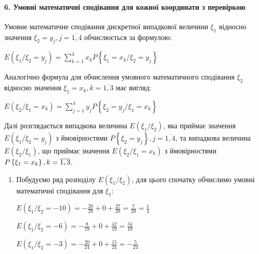 \documentclass[a4paper, 20pt, titlepage]{article}
\begin{document}
\vspace{-8mm}
\paragraph{6. Умовні математичні сподівання для кожної координати з перевіркою}
\hfill \break

\begin{spacing}{1.4}
Умовне математичне сподівання дискретної випадкової величини $\xi_1$ відносно значення $\xi_2 = y_j, j = \overline{1,4}$ обчислюється за формулою:

\begin{center}
$E\left(\xi_1/\xi_2 = y_j\right) = \sum \limits_{k=1}^3 x_k P\left\{\xi_1 = x_k / \xi_2 = y_j\right\} $
\end{center}

Аналогічно формула для обчислення умовного математичного сподівання $\xi_2$ відносно значення $\xi_1 = x_k, k = \overline{1,3}$ має вигляд:

\begin{center}
$E\left(\xi_2/\xi_1 = x_k\right) = \sum \limits_{j=1}^4 y_j P\left\{\xi_2 = y_j / \xi_1 = x_k\right\}$
\end{center}

Далі розглядається випадкова величина $E(\xi_1/\xi_2)$, яка приймає значення $E\left(\xi_1/\xi_2 = y_j\right)$ з ймовірностями $P\left\{\xi_2 = y_j\right\}, 
j = \overline{1,4}$, та випадкова величина $E(\xi_2/\xi_1)$, що приймає значення $E\left(\xi_2/\xi_1 = x_k\right)$ з ймовірностями $P\left\{\xi_1 = x_k\right\}, \\k = \overline{1,3}$.

\begin{enumerate}

\item Побудуємо ряд розподілу $E (\xi_1 / \xi_2)$, для цього спочатку обчислимо умовні математичні сподівання для $\xi_1$:

\vspace{3mm}

$E\left(\xi_1 / \xi_2 = -10 \right) = \displaystyle{-\frac{20}{28} + 0 + \frac{27}{28} = \frac{7}{28} = \frac{1}{4}}$

\vspace{1mm}

$E\left(\xi_1 / \xi_2 = -6 \right) = \displaystyle{-\frac{8}{19} + 0 + \frac{42}{19} = \frac{34}{19} }$

\vspace{1mm}

$E\left(\xi_1 / \xi_2 = -3 \right) = \displaystyle{-\frac{20}{24} + 0 + \frac{15}{24} = - \frac{5}{24} }$


\end{enumerate}
\end{spacing}
\end{document}

